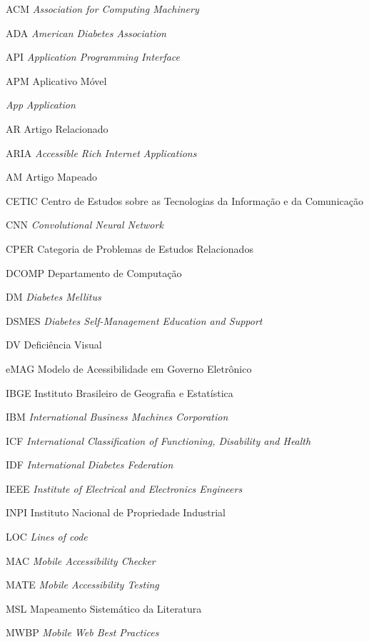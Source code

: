 
\begin{siglas}
	\item[ACM]{\textit{Association for Computing Machinery}}
	\item[ADA]{\textit{American Diabetes Association}}
	\item[API]{\textit{Application Programming Interface}}
	\item[APM]{Aplicativo Móvel}
	\item[\emph{App}]{\textit{Application}}
	\item[AR]{Artigo Relacionado}
	\item[ARIA]{\textit{Accessible Rich Internet Applications}}
	\item[AM]{Artigo Mapeado}
	\item[CETIC]{Centro de Estudos sobre as Tecnologias da Informação e da Comunicação}
	\item[CNN]{\textit{Convolutional Neural Network}}
	\item[CPER]{Categoria de Problemas de Estudos Relacionados}
	\item[DCOMP]{Departamento de Computação}
	\item[DM]{\emph{Diabetes Mellitus}}
	\item[DSMES]{\textit{Diabetes Self-Management Education and Support}}
	\item[DV]{Deficiência Visual}
	\item[eMAG]{Modelo de Acessibilidade em Governo Eletrônico}
	\item[IBGE]{Instituto Brasileiro de Geografia e Estatística}
	\item[IBM]{\textit{International Business Machines Corporation}}
	\item[ICF]{\textit{International Classification of Functioning, Disability and Health}}
	\item[IDF]{\textit{International Diabetes Federation}}
	\item[IEEE]{\textit{Institute of Electrical and Electronics Engineers}}
	\item[INPI]{Instituto Nacional de Propriedade Industrial}
	\item[LOC]{\textit{Lines of code}}
	\item[MAC]{\textit{Mobile Accessibility Checker}}
	\item[MATE]{\textit{Mobile Accessibility Testing}}
	\item[MSL]{Mapeamento Sistemático da Literatura}
	\item[MWBP]{\textit{Mobile Web Best Practices}}

\end{siglas}
